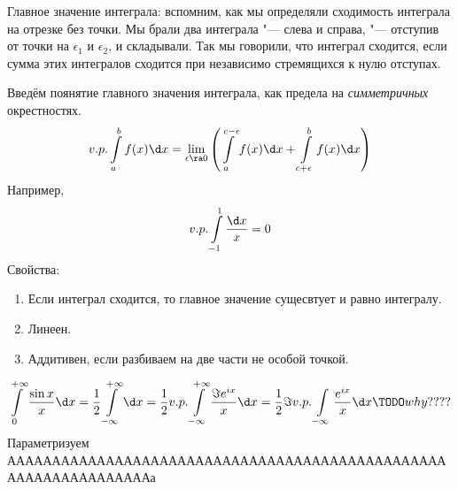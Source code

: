 \begin{Rem}
	Главное значение интеграла: вспомним, как мы определяли сходимость интеграла на отрезке без точки.
	Мы брали два интеграла "--- слева и справа, "--- отступив от точки на $\epsilon_1$ и $\epsilon_2$, и складывали.
	Так мы говорили, что интеграл сходится, если сумма этих интегралов сходится при независимо стремящихся к нулю отступах.

	Введём поянятие главного значения интеграла, как предела на \textit{симметричных} окрестностях.
	\[
		v.p. \int\limits_a^b f(x) \d x
		= \lim_{\epsilon\ra0} \left( \int\limits_a^{c-\epsilon} f(x) \d x + \int\limits_{c+\epsilon}^b f(x) \d x \right)
	\]
	Например,
	\[ v.p. \int\limits_{-1}^1 \frac{\d x}x = 0 \]
	Свойства:
	\begin{enumerate}
		\item Если интеграл сходится, то главное значение сущесвтует и равно интегралу.
		\item Линеен.
		\item Аддитивен, если разбиваем на две части не особой точкой.
	\end{enumerate}
\end{Rem}

\begin{exmp}
	\begin{gather*}
		\int\limits_0^{+\infty} \frac{\sin x}x \d x
		= \frac12 \int\limits_{-\infty}^{+\infty} \d x
		= \frac12 v. p. \int\limits_{-\infty}^{+\infty} \frac{\Im e^{ix}}x \d x
		= \frac12 \Im v.p.\int\limits_{-\infty} \frac{e^{ix}}x \d x \TODO why????
	\end{gather*}
	Параметризуем \TODO АААААААААААААААААААААААААААААААААААААААААААААААААААААААААААААААААа
\end{exmp}
